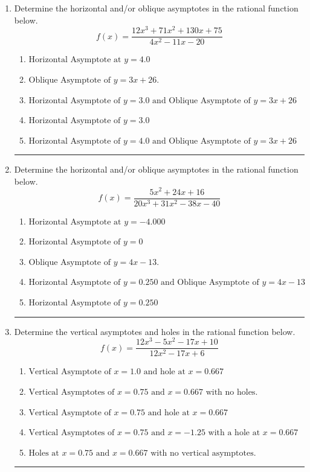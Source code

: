 \documentclass[14pt]{extbook}
\newcommand{\litem}[1]{\item#1\hspace*{-1cm}\rule{\textwidth}{0.4pt}}
\begin{document}
\begin{enumerate}
{\begin{enumerate}[label=\Alph*.]
\end{enumerate} }
\litem{
Determine the horizontal and/or oblique asymptotes in the rational function below.\[ f(x) = \frac{12x^{3} +71 x^{2} +130 x + 75}{4x^{2} -11 x -20} \]\begin{enumerate}[label=\Alph*.]
\item \( \text{Horizontal Asymptote at } y = 4.0 \)
\item \( \text{Oblique Asymptote of } y = 3x + 26. \)
\item \( \text{Horizontal Asymptote of } y = 3.0 \text{ and Oblique Asymptote of } y = 3x + 26 \)
\item \( \text{Horizontal Asymptote of } y = 3.0  \)
\item \( \text{Horizontal Asymptote of } y = 4.0 \text{ and Oblique Asymptote of } y = 3x + 26 \)

\end{enumerate} }
\litem{
Determine the horizontal and/or oblique asymptotes in the rational function below.\[ f(x) = \frac{5x^{2} +24 x + 16}{20x^{3} +31 x^{2} -38 x -40} \]\begin{enumerate}[label=\Alph*.]
\item \( \text{Horizontal Asymptote at } y = -4.000 \)
\item \( \text{Horizontal Asymptote of } y = 0 \)
\item \( \text{Oblique Asymptote of } y = 4x -13. \)
\item \( \text{Horizontal Asymptote of } y = 0.250 \text{ and Oblique Asymptote of } y = 4x -13 \)
\item \( \text{Horizontal Asymptote of } y = 0.250  \)

\end{enumerate} }
\litem{
Determine the vertical asymptotes and holes in the rational function below.\[ f(x) = \frac{12x^{3} -5 x^{2} -17 x + 10}{12x^{2} -17 x + 6} \]\begin{enumerate}[label=\Alph*.]
\item \( \text{Vertical Asymptote of } x = 1.0 \text{ and hole at } x = 0.667 \)
\item \( \text{Vertical Asymptotes of } x = 0.75 \text{ and } x = 0.667 \text{ with no holes.} \)
\item \( \text{Vertical Asymptote of } x = 0.75 \text{ and hole at } x = 0.667 \)
\item \( \text{Vertical Asymptotes of } x = 0.75 \text{ and } x = -1.25 \text{ with a hole at } x = 0.667 \)
\item \( \text{Holes at } x = 0.75 \text{ and } x = 0.667 \text{ with no vertical asymptotes.} \)


\end{enumerate}}
\end{enumerate}
\end{document}

